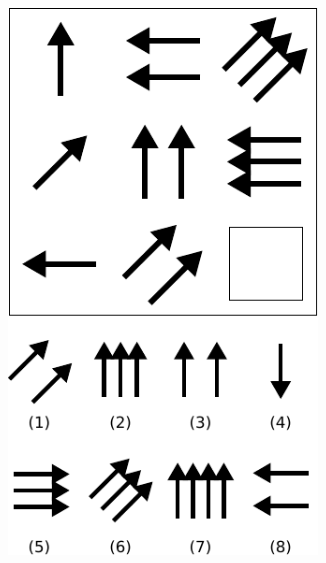 \documentclass[10pt,letterpaper,oneside]{article}
\begin{document}
\begin{figure}[t]
\begin{subfigure}{0.33\textwidth}
		\includegraphics[width=0.9\textwidth]{media/ravens_example_b.pdf}%
		\caption{}%
		\label{fig:ravens_example_b}%
	\end{subfigure}
	\begin{subfigure}{0.33\textwidth}%
		\centering%

\end{subfigure}
\end{figure}
\end{document}
